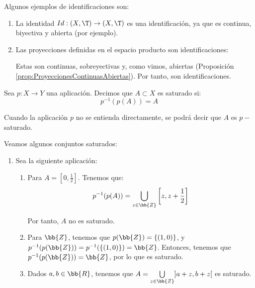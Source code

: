 \begin{ejemplo} Algunos ejemplos de identificaciones son:
\begin{enumerate}
    \item La identidad $Id:(X,\T)\to (X,\T)$ es una identificación, ya que es continua, biyectiva y abierta (por ejemplo).
    \item Las proyecciones definidas en el espacio producto son identificaciones:

        Estas son continuas, sobreyectivas y, como vimos, abiertas (Proposición \ref{prop:ProyeccionesContinuasAbiertas}). Por tanto, son identificaciones.
\end{enumerate}
\end{ejemplo}


\begin{definicion}
    Sea $p:X\to Y$ una aplicación. Decimos que $A\subset X$ es saturado si:
    \begin{equation*}
        p^{-1}(p(A))=A
    \end{equation*}

    Cuando la aplicación $p$ no se entienda directamente, se podrá decir que $A$ es $p-$saturado.
\end{definicion}
\begin{ejemplo} Veamos algunos conjuntos saturados:
    \begin{enumerate}
        \item Sea la siguiente aplicación:

        \begin{enumerate}
            \item Para $A=\left[0,\frac{1}{2}\right]$. Tenemos que:
            \begin{equation*}
                p^{-1}(p(A)) = \bigcup_{z\in \bb{Z}}\left[z,z+\frac{1}{2}\right]
            \end{equation*}
    
            Por tanto, $A$ no es saturado.
    
            \item Para $\bb{Z}$, tenemos que $p(\bb{Z})=\{(1,0)\}$, y $p^{-1}(p(\bb{Z}))=p^{-1}(\{(1,0)\})=\bb{Z}$. Entonces, tenemos que $p^{-1}(p(\bb{Z}))=\bb{Z}$, por lo que es saturado.

            \item Dados $a,b\in \bb{R}$, tenemos que $A=\bigcup\limits_{z\in \bb{Z}}]a+z, b+z[$ es saturado.
        \end{enumerate}
    \end{enumerate}
\end{ejemplo}


